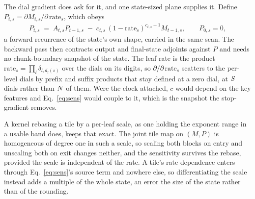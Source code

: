 The dial gradient does ask for it, and one state-sized plane supplies it. Define $P_{t,s} = \partial M_{t,s} / \partial\, \mathrm{rate}_s$, which obeys
\begin{align}
  P_{t,s} \;=\; A_{t,s} P_{t-1,s} \;-\; c_{t,s}\,(1-\mathrm{rate}_s)^{c_{t,s}-1} M_{t-1,s},
  \qquad P_{0,s} = 0 ,
  \label{eq:sens}
\end{align}
a forward recurrence of the state's own shape, carried in the same scan. The backward pass then contracts output and final-state adjoints against $P$ and needs no chunk-boundary snapshot of the state. The leaf rate is the product $\mathrm{rate}_s = \prod_l \delta_{l,d_l(s)}$ over the dials on its digits, so $\partial / \partial\, \mathrm{rate}_s$ scatters to the per-level dials by prefix and suffix products that stay defined at a zero dial, at $S$ dials rather than $N$ of them. Were the clock attached, $c$ would depend on the key features and Eq.~\eqref{eq:sens} would couple to it, which is the snapshot the stop-gradient removes.

A kernel rebasing a tile by a per-leaf scale, as one holding the exponent range in a usable band does, keeps that exact. The joint tile map on $(M, P)$ is homogeneous of degree one in such a scale, so scaling both blocks on entry and unscaling both on exit changes neither, and the sensitivity survives the rebase, provided the scale is independent of the rate. A tile's rate dependence enters through Eq.~\eqref{eq:sens}'s source term and nowhere else, so differentiating the scale instead adds a multiple of the whole state, an error the size of the state rather than of the rounding.


